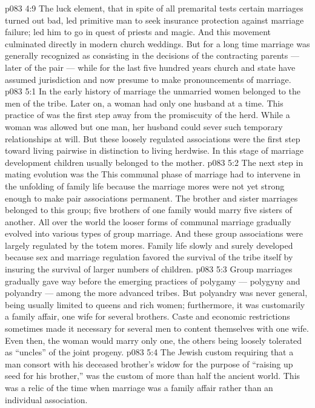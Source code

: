 \vs p083 4:9 The luck element, that in spite of all premarital tests certain marriages turned out bad, led primitive man to seek insurance protection against marriage failure; led him to go in quest of priests and magic. And this movement culminated directly in modern church weddings. But for a long time marriage was generally recognized as consisting in the decisions of the contracting parents --- later of the pair --- while for the last five hundred years church and state have assumed jurisdiction and now presume to make pronouncements of marriage.
\vs p083 5:1 In the early history of marriage the unmarried women belonged to the men of the tribe. Later on, a woman had only one husband at a time. This practice of  was the first step away from the promiscuity of the herd. While a woman was allowed but one man, her husband could sever such temporary relationships at will. But these loosely regulated associations were the first step toward living pairwise in distinction to living herdwise. In this stage of marriage development children usually belonged to the mother.
\vs p083 5:2 The next step in mating evolution was the  This communal phase of marriage had to intervene in the unfolding of family life because the marriage mores were not yet strong enough to make pair associations permanent. The brother and sister marriages belonged to this group; five brothers of one family would marry five sisters of another. All over the world the looser forms of communal marriage gradually evolved into various types of group marriage. And these group associations were largely regulated by the totem mores. Family life slowly and surely developed because sex and marriage regulation favored the survival of the tribe itself by insuring the survival of larger numbers of children.
\vs p083 5:3 Group marriages gradually gave way before the emerging practices of polygamy --- polygyny and polyandry --- among the more advanced tribes. But polyandry was never general, being usually limited to queens and rich women; furthermore, it was customarily a family affair, one wife for several brothers. Caste and economic restrictions sometimes made it necessary for several men to content themselves with one wife. Even then, the woman would marry only one, the others being loosely tolerated as “uncles” of the joint progeny.
\vs p083 5:4 The Jewish custom requiring that a man consort with his deceased brother’s widow for the purpose of “raising up seed for his brother,” was the custom of more than half the ancient world. This was a relic of the time when marriage was a family affair rather than an individual association.
